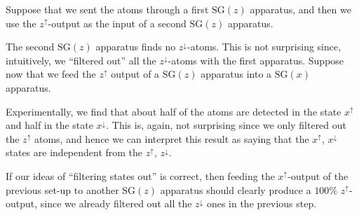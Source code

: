 Suppose that we sent the atoms through a first $\mathrm{SG}(z)$ apparatus, and then we use the $z^\uparrow$-output as the input of a second $\mathrm{SG}(z)$ apparatus.
\begin{center}
\end{center}
The second $\mathrm{SG}(z)$ apparatus finds no $z^\downarrow$-atoms. This is not surprising since, intuitively, we ``filtered out'' all the $z^\downarrow$-atoms with the first apparatus. Suppose now that we feed the $z^\uparrow$ output of a $\mathrm{SG}(z)$ apparatus into a $\mathrm{SG}(x)$ apparatus.

\begin{center}
\end{center}
Experimentally, we find that about half of the atoms are detected in the state $x^\uparrow$ and half in the state $x^\downarrow$. This is, again, not surprising since we only filtered out the $z^\uparrow$ atoms, and hence we can interpret this result as saying that the $x^\uparrow$, $x^\downarrow$ states are independent from the $z^\uparrow$, $z^\downarrow$.

If our ideas of ``filtering states out'' is correct, then feeding the $x^\uparrow$-output of the previous set-up to another $\mathrm{SG}(z)$ apparatus should clearly produce a $100\%$ $z^\uparrow$-output, since we already filtered out all the $z^\downarrow$ ones in the previous step.

